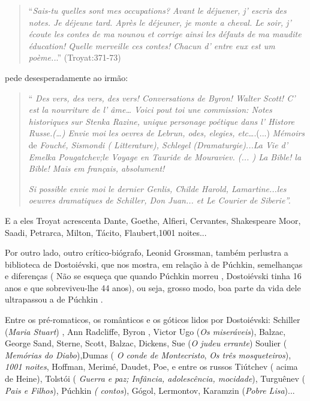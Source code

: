 \begin{quote}
``\emph{Sais-tu quelles sont mes occupations? Avant le déjuener, j'
escris des notes. Je déjeune tard. Après le déjeuner, je monte a cheval.
Le soir, j' écoute les contes de ma nounou et corrige ainsi les défauts
de ma maudite éducation! Quelle merveille ces contes! Chacun d' entre
eux est um poème..}.'' (Troyat:371-73)
\end{quote}

pede desesperadamente ao irmão:

\begin{quote}
`` \emph{Des vers, des vers, des vers! Conversations de Byron! Walter
Scott! C' est la nourriture de l' âme\ldots{} Voici pout toi une
commission: Notes historiques sur Stenka Razine, unique personage
poétique dans l' Histore Russe.(\ldots{}) Envie moi les oevres de
Lebrun, odes, elegies, etc}\ldots{}.(...) \emph{Mémoirs} de
\emph{Fouché, Sismondi ( Litterature), Schlegel (Dramaturgie)...La Vie
d' Emelka Pougatchev;le Voyage en Tauride de Mouraviev. (... ) La Bible!
la Bible! Mais em français, absolument!}

\emph{Si possible envie moi le dernier Genlis, Childe Harold,
Lamartine...les oeuvres dramatiques de Schiller, Don Juan... et Le
Courier de Siberie''.}
\end{quote}

E a eles Troyat acrescenta Dante, Goethe, Alfieri, Cervantes,
Shakespeare Moor, Saadi, Petrarca, Milton, Tácito, Flaubert,1001
noites...

Por outro lado, outro crítico-biógrafo, Leonid Grossman, também
perlustra a biblioteca de Dostoiévski, que nos mostra, em relação à de
Púchkin, semelhanças e diferenças ( Não se esqueça que quando Púchkin
morreu , Dostoiévski tinha 16 anos e que sobreviveu-lhe 44 anos), ou
seja, grosso modo, boa parte da vida dele ultrapassou a de Púchkin .

Entre os pré-romaticos, os românticos e os góticos lidos por
Dostoiévski: Schiller (\emph{Maria Stuart}) , Ann Radcliffe, Byron ,
Victor Ugo (\emph{Os miseráveis}), Balzac, George Sand, Sterne, Scott,
Balzac, Dickens, Sue (\emph{O judeu errante}) Soulier ( \emph{Memórias
do Diabo}),Dumas ( \emph{O conde de Montecristo}, \emph{Os três
mosqueteiros}), \emph{1001 noites}, Hoffman, Merimé, Daudet, Poe, e
entre os russos Tiútchev ( acima de Heine), Tolstói ( \emph{Guerra e}
\emph{paz; Infância, adolescência, mocidade}), Turguênev ( \emph{Pais e
Filhos}), Púchkin \emph{( contos}), Gógol, Lermontov, Karamzin
(\emph{Pobre Lisa})...


